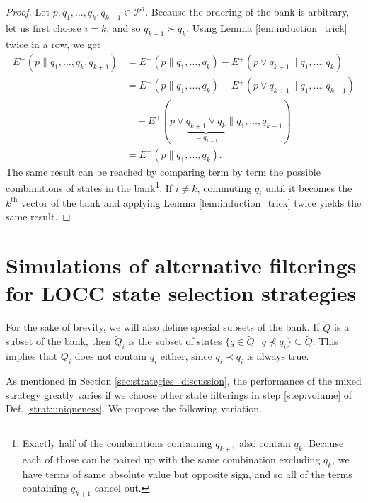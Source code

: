 \begin{proof}
    Let $p, q_1, \dots, q_k, q_{k+1} \in \mathcal{P}^d$.  Because the ordering of the bank is arbitrary, let us first choose $i = k$, and so $q_{k+1} \succ q_k$. Using Lemma \ref{lem:induction_trick} twice in a row, we get
    \begin{align}
        E^+(p \parallel q_1, \dots, q_k, q_{k+1}) &= E^+(p \parallel q_1, \dots, q_k) - E^+(p \vee q_{k+1} \parallel q_1, \dots, q_k)\\
                                                  &= E^+(p \parallel q_1, \dots, q_k) - E^+(p \vee q_{k+1} \parallel q_1, \dots, q_{k-1})\nonumber\\
                                                  &\quad + E^+(p \vee \underbrace{q_{k+1} \vee q_k}_{= q_{k+1}} \parallel q_1, \dots, q_{k-1})\\
                                                  &= E^+(p \parallel q_1, \dots, q_k).
    \end{align}
    The same result can be reached by comparing term by term the possible combinations of states in the bank\footnote{Exactly half of the combinations containing $q_{k+1}$ also contain $q_k$. Because each of those can be paired up with the same combination excluding $q_k$, we have terms of same absolute value but opposite sign, and so all of the terms containing $q_{k+1}$ cancel out.}. If $i \neq k$, commuting $q_i$ until it becomes the $k^\text{th}$ vector of the bank and applying Lemma \ref{lem:induction_trick} twice yields the same result. 
\end{proof}



\newpage

\section{Simulations of alternative filterings for LOCC state selection strategies} \label{app:alternative_filterings}

\setcounter{equation}{0}

For the sake of brevity, we will also define special subsets of the bank. If $\tilde{Q}$ is a subset of the bank, then $\tilde{Q}_i$ is the subset of states $\{q \in \tilde{Q} \: | \: q \nprec q_i\} \subseteq \tilde{Q}$. This implies that $\tilde{Q}_i$ does not contain $q_i$ either, since $q_i \prec q_i$ is always true.

As mentioned in Section \ref{sec:strategies_discussion}, the performance of the mixed strategy greatly varies if we choose other state filterings in step \ref{step:volume} of Def. \ref{strat:uniqueness}. We propose the following variation.

